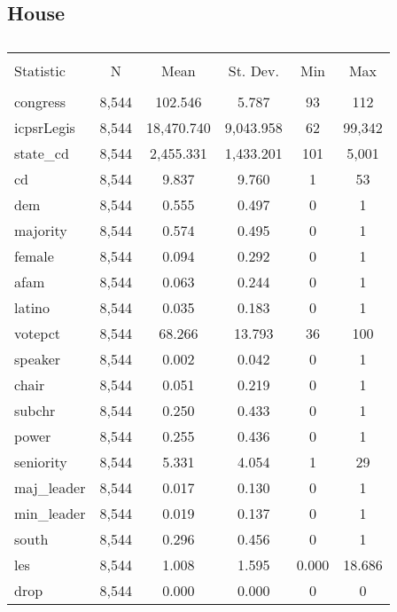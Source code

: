 \documentclass[12pt]{article}
\begin{document}
\subsection{House}

\begin{table}[H] \centering 
	\caption{} 
	\label{} 
	\begin{tabular}{@{\extracolsep{5pt}}lccccc} 
		\\[-1.8ex]\hline 
		\hline \\[-1.8ex] 
		Statistic & \multicolumn{1}{c}{N} & \multicolumn{1}{c}{Mean} & \multicolumn{1}{c}{St. Dev.} & \multicolumn{1}{c}{Min} & \multicolumn{1}{c}{Max} \\ 
		\hline \\[-1.8ex] 
		congress & 8,544 & 102.546 & 5.787 & 93 & 112 \\ 
		icpsrLegis & 8,544 & 18,470.740 & 9,043.958 & 62 & 99,342 \\ 
		state\_cd & 8,544 & 2,455.331 & 1,433.201 & 101 & 5,001 \\ 
		cd & 8,544 & 9.837 & 9.760 & 1 & 53 \\ 
		dem & 8,544 & 0.555 & 0.497 & 0 & 1 \\ 
		majority & 8,544 & 0.574 & 0.495 & 0 & 1 \\ 
		female & 8,544 & 0.094 & 0.292 & 0 & 1 \\ 
		afam & 8,544 & 0.063 & 0.244 & 0 & 1 \\ 
		latino & 8,544 & 0.035 & 0.183 & 0 & 1 \\ 
		votepct & 8,544 & 68.266 & 13.793 & 36 & 100 \\ 
		speaker & 8,544 & 0.002 & 0.042 & 0 & 1 \\ 
		chair & 8,544 & 0.051 & 0.219 & 0 & 1 \\ 
		subchr & 8,544 & 0.250 & 0.433 & 0 & 1 \\ 
		power & 8,544 & 0.255 & 0.436 & 0 & 1 \\ 
		seniority & 8,544 & 5.331 & 4.054 & 1 & 29 \\ 
		maj\_leader & 8,544 & 0.017 & 0.130 & 0 & 1 \\ 
		min\_leader & 8,544 & 0.019 & 0.137 & 0 & 1 \\ 
		south & 8,544 & 0.296 & 0.456 & 0 & 1 \\ 
		les & 8,544 & 1.008 & 1.595 & 0.000 & 18.686 \\ 
		drop & 8,544 & 0.000 & 0.000 & 0 & 0 \\ 

\end{tabular}
\end{table}
\end{document}
